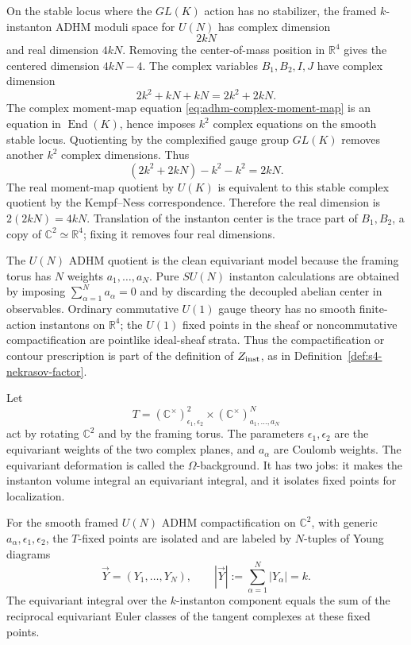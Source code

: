 On the stable locus where the \(GL(K)\) action has no stabilizer, the framed
\(k\)-instanton ADHM moduli space for \(U(N)\) has complex dimension
\[
  2kN
\]
and real dimension \(4kN\).  Removing the center-of-mass position in
\(\mathbb R^4\) gives the centered dimension \(4kN-4\).
The complex variables \(B_1,B_2,I,J\) have complex dimension
\[
  2k^2+kN+kN=2k^2+2kN .
\]
The complex moment-map equation
\eqref{eq:adhm-complex-moment-map} is an equation in
\(\operatorname{End}(K)\), hence imposes \(k^2\) complex equations on the
smooth stable locus.  Quotienting by the complexified gauge group
\(GL(K)\) removes another \(k^2\) complex dimensions.  Thus
\[
  (2k^2+2kN)-k^2-k^2=2kN .
\]
The real moment-map quotient by \(U(K)\) is equivalent to this stable
complex quotient by the Kempf--Ness correspondence.  Therefore the real
dimension is \(2(2kN)=4kN\).  Translation of the instanton center is the
trace part of \(B_1,B_2\), a copy of \(\mathbb C^2\simeq\mathbb R^4\);
fixing it removes four real dimensions.

\begin{remark}
\label{rem:adhm-u-n-su-n-compactification}
The \(U(N)\) ADHM quotient is the clean equivariant model because the framing
torus has \(N\) weights \(a_1,\ldots,a_N\).  Pure \(SU(N)\) instanton
calculations are obtained by imposing \(\sum_{\alpha=1}^Na_\alpha=0\) and by
discarding the decoupled abelian center in observables.  Ordinary
commutative \(U(1)\) gauge theory has no smooth finite-action instantons on
\(\mathbb R^4\); the \(U(1)\) fixed points in the sheaf or
noncommutative compactification are pointlike ideal-sheaf strata.  Thus the
compactification or contour prescription is part of the definition of
\(Z_{\rm inst}\), as in Definition~\ref{def:s4-nekrasov-factor}.
\end{remark}

Let
\[
  T=(\mathbb C^\times)^2_{\epsilon_1,\epsilon_2}
  \times(\mathbb C^\times)^N_{a_1,\ldots,a_N}
\]
act by rotating \(\mathbb C^2\) and by the framing torus.  The parameters
\(\epsilon_1,\epsilon_2\) are the equivariant weights of the two complex
planes, and \(a_\alpha\) are Coulomb weights.  The equivariant deformation is
called the \(\Omega\)-background.  It has two jobs: it makes the instanton
volume integral an equivariant integral, and it isolates fixed points for
localization.

\begin{quotedtheorem}
\label{qt:adhm-fixed-points-young-diagrams}
For the smooth framed \(U(N)\) ADHM compactification on \(\mathbb C^2\), with
generic \(a_\alpha,\epsilon_1,\epsilon_2\), the \(T\)-fixed points are
isolated and are labeled by \(N\)-tuples of Young diagrams
\[
  \vec Y=(Y_1,\ldots,Y_N),
  \qquad
  |\vec Y|:=\sum_{\alpha=1}^N |Y_\alpha|=k .
\]
The equivariant integral over the \(k\)-instanton component equals the sum of
the reciprocal equivariant Euler classes of the tangent complexes at these
fixed points.
\end{quotedtheorem}

